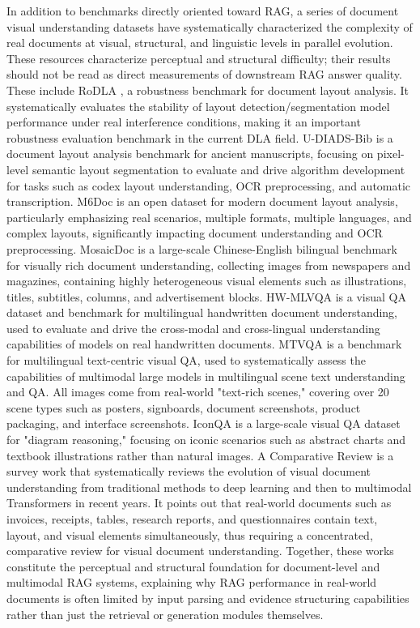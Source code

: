 In addition to benchmarks directly oriented toward RAG, a series of document visual understanding datasets have systematically characterized the complexity of real documents at visual, structural, and linguistic levels in parallel evolution. These resources characterize perceptual and structural difficulty; their results should not be read as direct measurements of downstream RAG answer quality. These include RoDLA \cite{rodla2024}, a robustness benchmark for document layout analysis. It systematically evaluates the stability of layout detection/segmentation model performance under real interference conditions, making it an important robustness evaluation benchmark in the current DLA field. U-DIADS-Bib \cite{udiadsbib2024} is a document layout analysis benchmark for ancient manuscripts, focusing on pixel-level semantic layout segmentation to evaluate and drive algorithm development for tasks such as codex layout understanding, OCR preprocessing, and automatic transcription. M6Doc \cite{m6doc2023} is an open dataset for modern document layout analysis, particularly emphasizing real scenarios, multiple formats, multiple languages, and complex layouts, significantly impacting document understanding and OCR preprocessing. MosaicDoc \cite{mosaicdoc2025} is a large-scale Chinese-English bilingual benchmark for visually rich document understanding, collecting images from newspapers and magazines, containing highly heterogeneous visual elements such as illustrations, titles, subtitles, columns, and advertisement blocks. HW-MLVQA \cite{hwmlvqa2025} is a visual QA dataset and benchmark for multilingual handwritten document understanding, used to evaluate and drive the cross-modal and cross-lingual understanding capabilities of models on real handwritten documents. MTVQA \cite{mtvqa2025} is a benchmark for multilingual text-centric visual QA, used to systematically assess the capabilities of multimodal large models in multilingual scene text understanding and QA. All images come from real-world "text-rich scenes," covering over 20 scene types such as posters, signboards, document screenshots, product packaging, and interface screenshots. IconQA \cite{iconqa2024} is a large-scale visual QA dataset for "diagram reasoning," focusing on iconic scenarios such as abstract charts and textbook illustrations rather than natural images. A Comparative Review \cite{vdureview2025} is a survey work that systematically reviews the evolution of visual document understanding from traditional methods to deep learning and then to multimodal Transformers in recent years. It points out that real-world documents such as invoices, receipts, tables, research reports, and questionnaires contain text, layout, and visual elements simultaneously, thus requiring a concentrated, comparative review for visual document understanding. Together, these works constitute the perceptual and structural foundation for document-level and multimodal RAG systems, explaining why RAG performance in real-world documents is often limited by input parsing and evidence structuring capabilities rather than just the retrieval or generation modules themselves.
